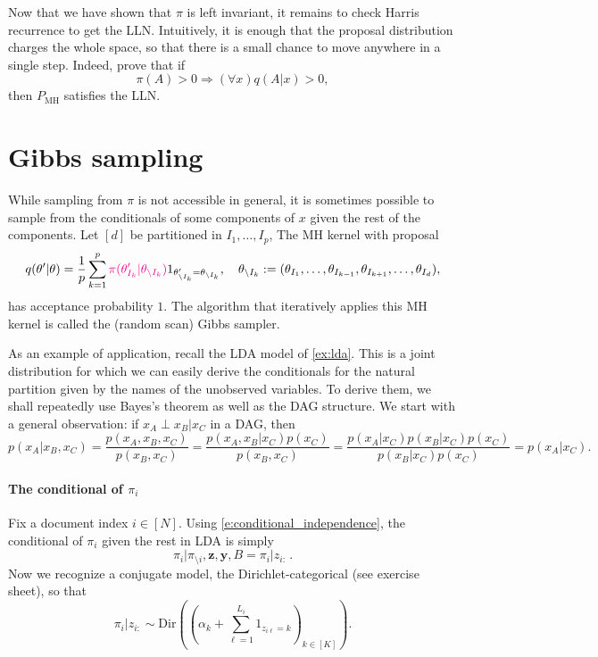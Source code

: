Now that we have shown that $\pi$ is left invariant, it remains to check Harris recurrence to get the LLN.
Intuitively, it is enough that the proposal distribution charges the whole space, so that there is a small chance to move anywhere in a single step.
Indeed, \cite{RoCa04} prove that if 
$$
    \pi(A)>0\Rightarrow (\forall x) q(A\vert x)>0, 
$$
then $P_{\text{MH}}$ satisfies the LLN.

\begin{example}
\end{example}

\section{Gibbs sampling}
\label{s:gibbs_sampling}

While sampling from $\pi$ is not accessible in general, it is sometimes possible to sample from the conditionals of some components of $x$ given the rest of the components. 
Let $[d]$ be partitioned in $I_1, \dots, I_p$,
The MH kernel with proposal
$$
    q(\theta'\vert\theta) = \frac1p \sum_{k=1}^p \textcolor{magenta}{\pi(\theta'_{I_k}\vert \theta_{\setminus I_k})} 1_{\theta'_{\setminus I_k} = \theta_{\setminus I_k}}, \quad \theta_{\setminus I_k}:= (\theta_{I_1},\dots,\theta_{I_{k-1}},\theta_{I_{k+1}},\dots,\theta_{I_d}),
$$
has acceptance probability $1$. 
The algorithm that iteratively applies this MH kernel is called the (random scan) Gibbs sampler.

As an example of application, recall the LDA model of \cref{ex:lda}. 
This is a joint distribution for which we can easily derive the conditionals for the natural partition given by the names of the unobserved variables.
To derive them, we shall repeatedly use Bayes's theorem as well as the DAG structure.
We start with a general observation: if $x_A\perp x_B\vert x_C$ in a DAG, then 
\begin{equation}
    \label{e:conditional_independence}
    p(x_A\vert x_B, x_C) = \frac{p(x_A, x_B, x_C)}{p(x_B, x_C)} = \frac{p(x_A, x_B \vert x_C) p(x_C)}{p(x_B, x_C)} = \frac{p(x_A\vert x_C) p(x_B\vert x_C) p(x_C)}{{p(x_B\vert x_C)p(x_C)}} = p(x_A\vert x_C).
\end{equation}

\paragraph{The conditional of $\pi_i$} 
Fix a document index $i\in[N]$. 
Using \eqref{e:conditional_independence}, the conditional of $\pi_i$ given the rest in LDA is simply
$$ 
    \pi_i \vert \pi_{\setminus i}, \mathbf{z}, \mathbf{y}, B = \pi_i \vert z_{i:} \, .
$$
Now we recognize a conjugate model, the Dirichlet-categorical (see exercise sheet), so that 
$$
    \pi_i \vert z_{i:} \sim \mathrm{Dir}\left ((\alpha_k + \sum_{\ell=1}^{L_i} 1_{z_{i\ell}=k})_{k\in [K]} \right ).
$$

